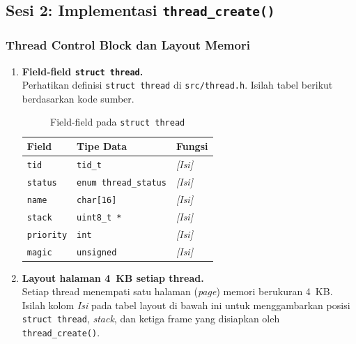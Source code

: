 \subsection{Sesi 2: Implementasi \texttt{thread\_create()}}

\subsubsection{Thread Control Block dan Layout Memori}

\begin{enumerate}

	\item \textbf{Field-field \texttt{struct thread}.}\\
	      Perhatikan definisi \texttt{struct thread} di \texttt{src/thread.h}.
	      Isilah tabel berikut berdasarkan kode sumber.

	      \begin{table}[!ht]
		      \caption{Field-field pada \texttt{struct thread}}
		      \label{tab:h04-struct-thread}
		      \centering
		      \begin{tabulary}{\linewidth}{|L|L|L|}
			      \hline
			      \textbf{Field} & \textbf{Tipe Data} & \textbf{Fungsi} \\
			      \hline
			      \texttt{tid}      & \texttt{tid\_t}              & \textit{[Isi]} \\
			      \hline
			      \texttt{status}   & \texttt{enum thread\_status} & \textit{[Isi]} \\
			      \hline
			      \texttt{name}     & \texttt{char[16]}            & \textit{[Isi]} \\
			      \hline
			      \texttt{stack}    & \texttt{uint8\_t *}          & \textit{[Isi]} \\
			      \hline
			      \texttt{priority} & \texttt{int}                 & \textit{[Isi]} \\
			      \hline
			      \texttt{magic}    & \texttt{unsigned}            & \textit{[Isi]} \\
			      \hline
		      \end{tabulary}
	      \end{table}

	\item \textbf{Layout halaman 4~KB setiap thread.}\\
	      Setiap thread menempati satu halaman (\textit{page}) memori berukuran
	      4~KB. Isilah kolom \textit{Isi} pada tabel layout di bawah ini
	      untuk menggambarkan posisi \texttt{struct thread}, \textit{stack},
	      dan ketiga frame yang disiapkan oleh \texttt{thread\_create()}.


\end{enumerate}
